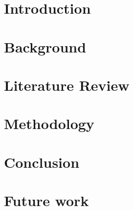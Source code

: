 \documentclass{article}
\begin{document}
    \fi

    \begin{multicols}{2}
    \section{Introduction}\label{sec:introduction}
    

    \section{Background}\label{sec:background}
    

    \section{Literature Review}\label{sec:literature-review}
    

    \section{Methodology}\label{sec:methodology}
    

    \section{Conclusion}\label{sec:conclusion}

    \section{Future work}\label{sec:futurework}
    
    \printbibliography
    \end{multicols}
\end{document}
